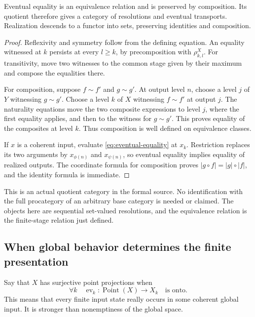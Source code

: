 \begin{theorem}\label{KS61}
Eventual equality is an equivalence relation and is preserved by composition. Its quotient therefore gives a category of resolutions and eventual transports. Realization descends to a functor into sets, preserving identities and composition.
\end{theorem}
\begin{proof}
Reflexivity and symmetry follow from the defining equation. An equality witnessed at \(k\) persists at every \(l\ge k\), by precomposition with \(\rho^X_{k,l}\). For transitivity, move two witnesses to the common stage given by their maximum and compose the equalities there.

For composition, suppose \(f\sim f'\) and \(g\sim g'\). At output level \(n\), choose a level \(j\) of \(Y\) witnessing \(g\sim g'\). Choose a level \(k\) of \(X\) witnessing \(f\sim f'\) at output \(j\). The naturality equations move the two composite expressions to level \(j\), where the first equality applies, and then to the witness for \(g\sim g'\). This proves equality of the composites at level \(k\). Thus composition is well defined on equivalence classes.

If \(x\) is a coherent input, evaluate \eqref{eq:eventual-equality} at \(x_k\). Restriction replaces its two arguments by \(x_{\phi(n)}\) and \(x_{\psi(n)}\), so eventual equality implies equality of realized outputs. The coordinate formula for composition proves \(|g\circ f|=|g|\circ|f|\), and the identity formula is immediate.
\end{proof}
This is an actual quotient category in the formal source. No identification with the full procategory of an arbitrary base category is needed or claimed. The objects here are sequential set-valued resolutions, and the equivalence relation is the finite-stage relation just defined.

\subsection{When global behavior determines the finite presentation}
Say that \(X\) has surjective point projections when
\[
 \forall k\quad \operatorname{ev}_k:\operatorname{Point}(X)\to X_k
 \quad\text{is onto}.
\]
This means that every finite input state really occurs in some coherent global input. It is stronger than nonemptiness of the global space.

